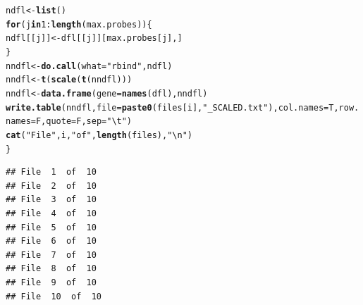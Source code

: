 \documentclass{article}\usepackage[]{graphicx}\usepackage[]{color}
\makeatletter
\newcommand{\hlnum}[1]{\textcolor[rgb]{0.686,0.059,0.569}{#1}}%
\newcommand{\hlstr}[1]{\textcolor[rgb]{0.192,0.494,0.8}{#1}}%
\newcommand{\hlopt}[1]{\textcolor[rgb]{0,0,0}{#1}}%
\newcommand{\hlstd}[1]{\textcolor[rgb]{0.345,0.345,0.345}{#1}}%
\newcommand{\hlkwa}[1]{\textcolor[rgb]{0.161,0.373,0.58}{\textbf{#1}}}%
\newcommand{\hlkwb}[1]{\textcolor[rgb]{0.69,0.353,0.396}{#1}}%
\newcommand{\hlkwc}[1]{\textcolor[rgb]{0.333,0.667,0.333}{#1}}%
\newcommand{\hlkwd}[1]{\textcolor[rgb]{0.737,0.353,0.396}{\textbf{#1}}}%
\newenvironment{kframe}{%
 \def\at@end@of@kframe{}%
 \ifinner\ifhmode%
  \def\at@end@of@kframe{\end{minipage}}%
  \begin{minipage}{\columnwidth}%
 \fi\fi%
 \def\FrameCommand##1{\hskip\@totalleftmargin \hskip-\fboxsep
 \colorbox{shadecolor}{##1}\hskip-\fboxsep
     \hskip-\linewidth \hskip-\@totalleftmargin \hskip\columnwidth}%
 \MakeFramed {\advance\hsize-\width
   \@totalleftmargin\z@ \linewidth\hsize
   \@setminipage}}%
 {\par\unskip\endMakeFramed%
 \at@end@of@kframe}
\newenvironment{knitrout}{}{} %
\makeatother
\begin{document}
\begin{knitrout}
\begin{kframe}
\begin{alltt}
 \hlstd{ndfl} \hlkwb{<-} \hlkwd{list}\hlstd{()}
 \hlkwa{for}\hlstd{(j} \hlkwa{in} \hlnum{1}\hlopt{:}\hlkwd{length}\hlstd{(max.probes))\{}
   \hlstd{ndfl[[j]]}\hlkwb{<-}\hlstd{dfl[[j]][max.probes[j],]}
 \hlstd{\}}
 \hlstd{nndfl} \hlkwb{<-} \hlkwd{do.call}\hlstd{(}\hlkwc{what}\hlstd{=}\hlstr{"rbind"}\hlstd{,ndfl)}
 \hlstd{nndfl} \hlkwb{<-} \hlkwd{t}\hlstd{(}\hlkwd{scale}\hlstd{(}\hlkwd{t}\hlstd{(nndfl)))}
 \hlstd{nndfl} \hlkwb{<-} \hlkwd{data.frame}\hlstd{(}\hlkwc{gene}\hlstd{=}\hlkwd{names}\hlstd{(dfl),nndfl)}
 \hlkwd{write.table}\hlstd{(nndfl,}\hlkwc{file}\hlstd{=}\hlkwd{paste0}\hlstd{(files[i],}\hlstr{"_SCALED.txt"}\hlstd{),}\hlkwc{col.names}\hlstd{=T,}\hlkwc{row.names}\hlstd{=F,}\hlkwc{quote}\hlstd{=F,}\hlkwc{sep}\hlstd{=}\hlstr{"\textbackslash{}t"}\hlstd{)}
 \hlkwd{cat}\hlstd{(}\hlstr{"File "}\hlstd{,i,}\hlstr{" of "}\hlstd{,}\hlkwd{length}\hlstd{(files),}\hlstr{"\textbackslash{}n"}\hlstd{)}
\hlstd{\}}
\end{alltt}
\begin{verbatim}
## File  1  of  10 
## File  2  of  10 
## File  3  of  10 
## File  4  of  10 
## File  5  of  10 
## File  6  of  10 
## File  7  of  10 
## File  8  of  10 
## File  9  of  10 
## File  10  of  10
\end{verbatim}
\end{kframe}
\end{knitrout}
\end{document}
